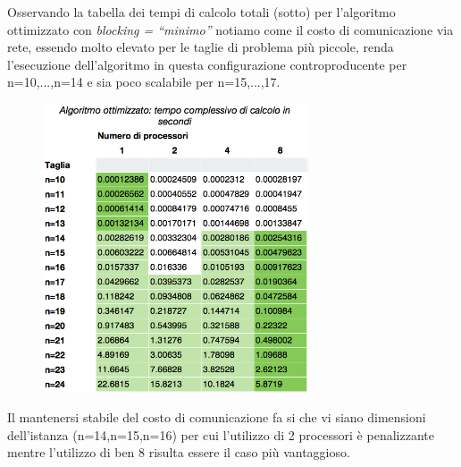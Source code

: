 \documentclass[12pt,a4paper,oneside,openright]{article}
\begin{document}
Osservando la tabella dei tempi di calcolo totali (sotto) per l'algoritmo ottimizzato con \emph{blocking = ``minimo''} notiamo come il costo di comunicazione via rete, essendo molto elevato per le taglie di problema più piccole, renda l'esecuzione dell'algoritmo in questa configurazione controproducente per n=10,...,n=14 e sia poco scalabile per  n=15,...,17.
\begin{figure}[htp] 
  \centering
      \includegraphics[width=0.7\textwidth, height=0.43\textheight]{immagini/algoritmo_ottimizzato_tempo_calcolo_con_rete}
\end{figure}
Il mantenersi stabile del costo di comunicazione fa si che vi siano dimensioni dell'istanza (n=14,n=15,n=16) per cui l'utilizzo di 2 processori è penalizzante mentre l'utilizzo di ben 8 risulta essere il caso più vantaggioso.
\end{document}
